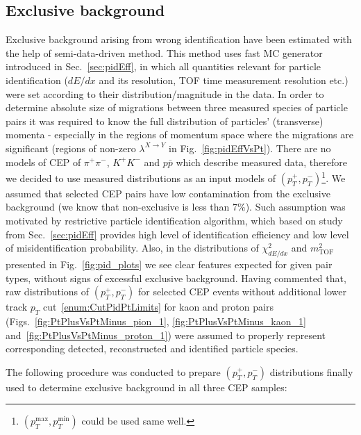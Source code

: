\subsection{Exclusive background}\label{sec:exclBkgdDetermination}

Exclusive background arising from wrong identification have been estimated with the help of semi-data-driven method. This method uses fast MC generator introduced in Sec.~\ref{sec:pidEff}, in which all quantities relevant for particle identification ($dE/dx$ and its resolution, TOF time measurement resolution etc.) were set according to their distribution/magnitude in the data. In order to determine absolute size of migrations between three measured species of particle pairs it was required to know the full distribution of particles' (transverse) momenta - especially in the regions of momentum space where the migrations are significant (regions of non-zero $\lambda^{X\rightarrow Y}$ in Fig.~\ref{fig:pidEffVsPt}). There are no models of CEP of $\pi^{+}\pi^{-}$, $K^{+}K^{-}$ and $p\bar{p}$ which describe measured data, therefore we decided to use measured distributions as an input models of $(p_{T}^{+}, p_{T}^{-})$\footnote{$(p_{T}^{\text{max}}, p_{T}^{\text{min}})$ could be used same well.}. We assumed that selected CEP pairs have low contamination from the exclusive background (we know that non-exclusive is less than 7\%). Such assumption was motivated by restrictive particle identification algorithm, which based on study from Sec.~\ref{sec:pidEff} provides high level of identification efficiency and low level of misidentification probability. Also, in the distributions of $\chi^{2}_{dE/dx}$ and $m^{2}_{\text{TOF}}$ presented in Fig.~\ref{fig:pid_plots} we see clear features expected for given pair types, without signs of excessful exclusive background. Having commented that, raw distributions of $(p_{T}^{+}, p_{T}^{-})$ for selected CEP events without additional lower track $p_{T}$ cut~\ref{enum:CutPidPtLimits} for kaon and proton pairs (Figs.~\ref{fig:PtPlusVsPtMinus_pion_1}, \ref{fig:PtPlusVsPtMinus_kaon_1} and~\ref{fig:PtPlusVsPtMinus_proton_1}) were assumed to properly represent corresponding detected, reconstructed and identified particle species.

The following procedure was conducted to prepare $(p_{T}^{+}, p_{T}^{-})$ distributions finally used to determine exclusive background in all three CEP samples:

